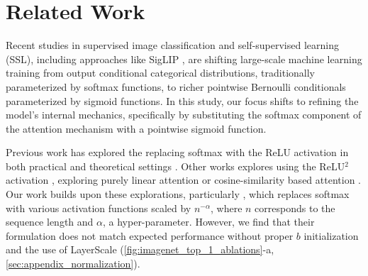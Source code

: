 \section{Related Work}
\label{sec:related}
Recent studies in supervised image classification \citep{DBLP:journals/corr/abs-2110-00476} and self-supervised learning (SSL), including approaches like SigLIP \citep{DBLP:journals/corr/abs-2303-15343}, 
are shifting large-scale machine learning training from output conditional categorical distributions, traditionally parameterized by softmax functions, to richer pointwise Bernoulli conditionals parameterized 
by sigmoid functions. In this study, our focus shifts to refining the model's internal mechanics, specifically by substituting the softmax component of the attention mechanism with a pointwise sigmoid function.

Previous work has explored the replacing softmax with the ReLU activation in both practical \citep{DBLP:journals/corr/abs-2302-06461,DBLP:conf/icml/HronBSN20} and theoretical settings \citep{DBLP:conf/nips/BaiCWXM23,DBLP:conf/nips/Fu00M23}. Other works explores using the ReLU$^2$ activation \citep{DBLP:conf/icml/HuaDLL22}, exploring purely linear attention \citep{DBLP:conf/icml/KatharopoulosV020,DBLP:conf/nips/LuYZZXGXXZ21,DBLP:conf/wacv/KoohpayeganiP24} or cosine-similarity based attention \citep{DBLP:conf/icann/LuoZXWRY18,DBLP:conf/cvpr/Liu0LYXWN000WG22}. 
Our work builds upon these explorations, particularly \cite{wortsman2023replacing}, which replaces softmax with various activation functions scaled by $n^{-\alpha}$, where $n$ corresponds to the sequence length and $\alpha$, a hyper-parameter. However, we find that their formulation does not match expected performance without proper $b$ initialization and the use of LayerScale (\cref{fig:imagenet_top_1_ablations}-a, \cref{sec:appendix_normalization}). 
